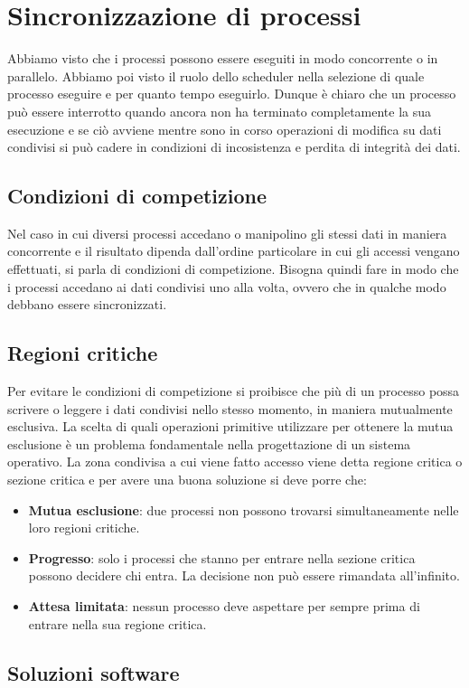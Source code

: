 \section{Sincronizzazione di processi}
Abbiamo visto che i processi possono essere eseguiti in modo concorrente o in parallelo. Abbiamo poi visto il ruolo dello scheduler nella selezione di quale processo eseguire e per quanto tempo eseguirlo. Dunque è chiaro che un processo può essere interrotto quando ancora non ha terminato completamente la sua esecuzione e se ciò avviene mentre sono in corso operazioni di modifica su dati condivisi si può cadere in condizioni di incosistenza e perdita di integrità dei dati.
\subsection{Condizioni di competizione}
Nel caso in cui diversi processi accedano o manipolino gli stessi dati in maniera concorrente e il risultato dipenda dall'ordine particolare in cui gli accessi vengano effettuati, si parla di condizioni di competizione. Bisogna quindi fare in modo che i processi accedano ai dati condivisi uno alla volta, ovvero che in qualche modo debbano essere sincronizzati.
\subsection{Regioni critiche}
Per evitare le condizioni di competizione si proibisce che più di un processo possa scrivere o leggere i dati condivisi nello stesso momento, in maniera mutualmente esclusiva. La scelta di quali operazioni primitive utilizzare per ottenere la mutua esclusione è un problema fondamentale nella progettazione di un sistema operativo. La zona condivisa a cui viene fatto accesso viene detta regione critica o sezione critica e per avere una buona soluzione si deve porre che:
\begin{itemize}
	\item \textbf{Mutua esclusione}: due processi non possono trovarsi simultaneamente nelle loro regioni critiche.
	\item \textbf{Progresso}: solo i processi che stanno per entrare nella sezione critica possono decidere chi entra.
	      La decisione non può essere rimandata all'infinito.
	\item \textbf{Attesa limitata}: nessun processo deve aspettare per sempre prima di entrare nella sua regione critica.
\end{itemize}

\subsection{Soluzioni software}

